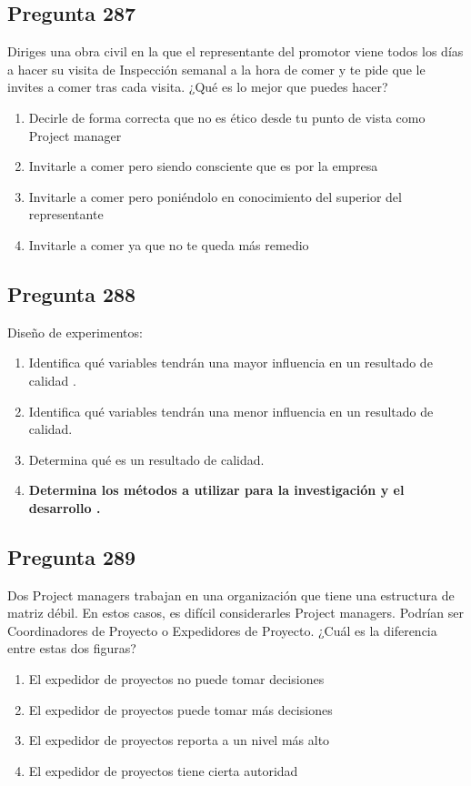 \documentclass[11pt,a4paper]{article}
\begin{document}
\subsection*{Pregunta 287}
Diriges una obra civil en la que el representante del promotor viene todos los días a hacer su visita de Inspección semanal a la hora de comer y te pide que le invites a comer tras cada visita. ¿Qué es lo mejor que puedes hacer?

\begin{enumerate}[label=\alph*)]
  \item Decirle de forma correcta que no es ético desde tu punto de vista como Project manager
  \item Invitarle a comer pero siendo consciente que es por la empresa
  \item Invitarle a comer pero poniéndolo en conocimiento del superior del representante
  \item Invitarle a comer ya que no te queda más remedio
\end{enumerate}

\subsection*{Pregunta 288}
Diseño de experimentos:

\begin{enumerate}[label=\alph*)]
  \item Identifica qué variables tendrán una mayor influencia en un resultado de calidad .
  \item Identifica qué variables tendrán una menor influencia en un resultado de calidad.
  \item Determina qué es un resultado de calidad.
  \item \textbf{Determina los métodos a utilizar para la investigación y el desarrollo .}
\end{enumerate}

\subsection*{Pregunta 289}
Dos Project managers trabajan en una organización que tiene una estructura de matriz débil. En estos casos, es difícil considerarles Project managers. Podrían ser Coordinadores de Proyecto o Expedidores de Proyecto. ¿Cuál es la diferencia entre estas dos figuras?

\begin{enumerate}[label=\alph*)]
  \item El expedidor de proyectos no puede tomar decisiones
  \item El expedidor de proyectos puede tomar más decisiones
  \item El expedidor de proyectos reporta a un nivel más alto
  \item El expedidor de proyectos tiene cierta autoridad
\end{enumerate}
\end{document}
